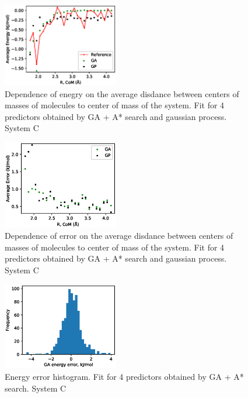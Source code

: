 \documentclass[aip,jcp,reprint,amsmath,amssymb,nature]{revtex4-1}
\begin{document}
\begin{figure}
\includegraphics[width=0.45\textwidth]{media/C_Energy_4_predictors.eps}
\caption{Dependence of enegry on the average disdance between centers of masses of molecules to center of mass of the system. Fit for 4 predictors obtained by GA + A* search and gaussian process. System C}\label{Fig:C_Energy_4_predictors}
\end{figure}

\begin{figure}
\includegraphics[width=0.45\textwidth]{media/C_Error_4_predictors.eps}
\caption{Dependence of error on the average disdance between centers of masses of molecules to center of mass of the system. Fit for 4 predictors obtained by GA + A* search and gaussian process. System C}\label{Fig:C_RMSE_4_predictors}
\end{figure}

\begin{figure}
\includegraphics[width=0.45\textwidth]{media/C_GA_energy_error_histogram_4_predictors.eps}
\caption{Energy error histogram. Fit for 4 predictors obtained by GA + A* search. System C}\label{Fig:C_histogram_4_predictors}
\end{figure}
\end{document}

